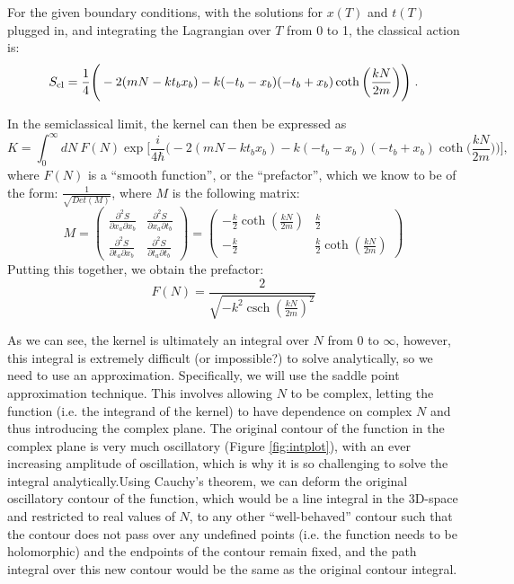 \documentclass[12pt]{revtex4}
\DeclareMathOperator{\csch}{csch}
\begin{document}
For the given boundary conditions, with the solutions for $x(T)$ and $t(T)$ plugged in, and integrating the Lagrangian over $T$ from 0 to 1, the classical action  is:
\begin{equation*}
S_{\rm cl} = \frac{1}{4} \Bigg(-2 (m N - k t_b x_b) - k (-t_b - x_b) (-t_b + x_b) \coth\bigg(\frac{k N}{2 m}\bigg)\Bigg) \; .
\end{equation*} 

In the semiclassical limit, the kernel can then be expressed as 
\[ K=\int_{0}^{\infty} dN\ F(N) \exp \Bigg[\frac{i}{4 \hbar} \Bigg(-2 (m N - k t_b x_b) - k (-t_b - x_b) (-t_b + x_b) \coth\bigg(\frac{k N}{2 m}\bigg)\Bigg)\Bigg],\]
where $F(N)$ is a ``smooth function'', or the ``prefactor'', which we know to be of the form: $\frac{1}{\sqrt{Det(M)}}$, where $M$ is the following matrix:
\[ M=\begin{pmatrix}
\frac{\partial^2 S}{\partial x_a \partial x_b} & \frac{\partial^2 S}{\partial x_a \partial t_b} \\ 
\frac{\partial^2 S}{\partial t_a \partial x_b} & \frac{\partial^2 S}{\partial t_a \partial t_b} 
\end{pmatrix} = 
\begin{pmatrix}
-\frac{k}{2}  \coth(\frac{k N}{2 m}) & \frac{k}{2} \\ 
-\frac{k}{2} & \frac{k}{2} \coth(\frac{k N}{2 m})
\end{pmatrix} \]
Putting this together, we obtain the prefactor:
\[ F(N)=\frac{2}{\sqrt{-k^2 \csch(\frac{k N}{2 m})^2}} \]

As we can see, the kernel is ultimately an integral over $N$ from 0 to $\infty$, however, this integral is extremely difficult (or impossible?) to solve analytically, so we need to use an approximation. Specifically, we will use the saddle point approximation technique. This involves allowing $N$ to be complex, letting the function (i.e. the integrand of the kernel) to have dependence on complex $N$ and thus introducing the complex plane. The original contour of the function in the complex plane is very much oscillatory (Figure \ref{fig:intplot}), with an ever increasing amplitude of oscillation, which is why it is so challenging to solve the integral analytically.Using Cauchy's theorem, we can deform the original oscillatory contour of the function, which would be a line integral in the 3D-space and restricted to real values of $N$, to any other ``well-behaved'' contour such that the contour does not pass over any undefined points (i.e. the function needs to be holomorphic) and the endpoints of the contour remain fixed, and the path integral over this new contour would be the same as the original contour integral.
\end{document}
